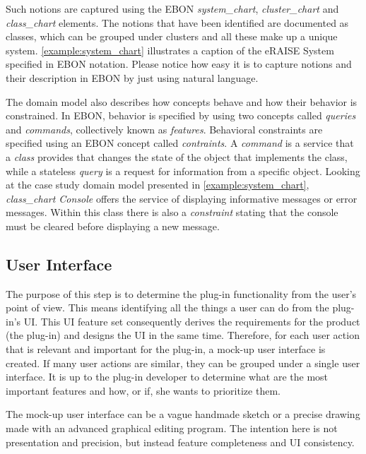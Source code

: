 \documentclass[conference]{IEEEtran}
\begin{document}


Such notions are captured using the EBON \emph{system\_chart},
\emph{cluster\_chart} and \emph{class\_chart} elements. The notions
that have been identified are documented as classes, which can be
grouped under clusters and all these make up a unique system.
\autoref{example:system_chart} illustrates a caption of the eRAISE
System specified in EBON notation. Please notice how easy it is to
capture notions and their description in EBON by just using natural
language.

The domain model also describes how concepts behave and how their
behavior is constrained.  In EBON, behavior is specified by using two
concepts called \emph{queries} and \emph{commands}, collectively known
as \emph{features}.  Behavioral constraints are specified using an
EBON concept called \emph{contraints}.  A \emph{command} is a service
that a \emph{class} provides that changes the state of the object that
implements the class, while a stateless \emph{query} is a request for
information from a specific object.  Looking at the case study domain
model presented in \autoref{example:system_chart}, \emph{class\_chart
  Console} offers the service of displaying informative messages or
error messages.  Within this class there is also a \emph{constraint}
stating that the console must be cleared before displaying a new
message.

%
\subsection{User Interface}
\label{sec:user-interface}

The purpose of this step is to determine the plug-in functionality
from the user's point of view. This means identifying all the things a
user can do from the plug-in's UI. This UI feature set consequently
derives the requirements for the product (the plug-in) and designs the
UI in the same time. Therefore, for each user action that is relevant
and important for the plug-in, a mock-up user interface is created. If
many user actions are similar, they can be grouped under a single user
interface. It is up to the plug-in developer to determine what are the
most important features and how, or if, she wants to prioritize them.

The mock-up user interface can be a vague handmade sketch or a
precise drawing made with an advanced graphical editing program.  The
intention here is not presentation and precision, but instead feature
completeness and UI consistency.
\end{document}
